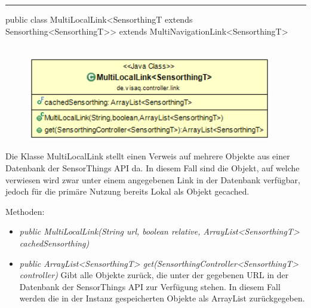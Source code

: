 \rule{\textwidth}{0.4pt}
public class MultiLocalLink<SensorthingT extends Sensorthing<SensorthingT>> extends MultiNavigationLink<SensorthingT>
\\\\
\begin{minipage}{0.5\textwidth}
    \begin{figure}[H]
        {\centering\includegraphics[width=0.95\textwidth]{media/backend/controller/classes/MultiLocalLink.png}}
    \end{figure}
    \end{minipage} \hfill
\begin{minipage}{0.5\textwidth}
    Die Klasse MultiLocalLink stellt einen Verweis auf mehrere Objekte aus einer Datenbank der \gls{SensorThings API} da.
    In diesem Fall sind die Objekt, auf welche verwiesen wird zwar unter einem angegebenen Link in der Datenbank verfügbar, jedoch für die primäre Nutzung bereits Lokal als Objekt gecached.
\end{minipage}

Methoden:
\begin{itemize}
    \item \emph{public MultiLocalLink(String url, boolean relative, ArrayList<SensorthingT> cachedSensorthing)}
    \relativeDescription
    \item \emph{public ArrayList<SensorthingT> get(SensorthingController<SensorthingT> controller)}
    Gibt alle Objekte zurück, die unter der gegebenen URL in der Datenbank der \gls{SensorThings API} zur Verfügung stehen.
    In diesem Fall werden die in der Instanz gespeicherten Objekte als ArrayList zurückgegeben.
\end{itemize}

